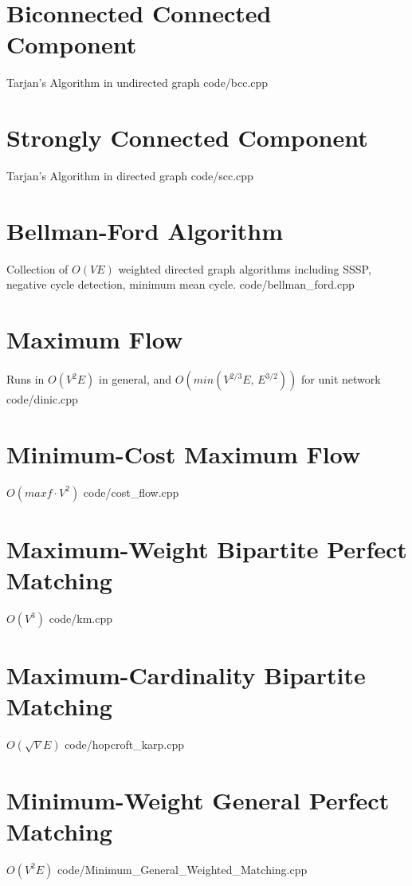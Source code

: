 \documentclass [landscape,8pt,a4paper,twocolumn]{article}
\begin{document}
\section{Biconnected Connected Component}
Tarjan's Algorithm in undirected graph
 {code/bcc.cpp}

\section{Strongly Connected Component}
Tarjan's Algorithm in directed graph
 {code/scc.cpp}

\section{Bellman-Ford Algorithm}
Collection of $ O(VE) $ weighted directed graph algorithms including SSSP, negative cycle detection, minimum mean cycle.
 {code/bellman_ford.cpp}

\vfill\null

\section{Maximum Flow}
Runs in $ O(V^2E) $ in general, and $ O(min(V^{2/3}E,\, E^{3/2})) $ for unit network
 {code/dinic.cpp}

\section{Minimum-Cost Maximum Flow}
$ O(maxf \cdot V^2) $
 {code/cost_flow.cpp}

\section{Maximum-Weight Bipartite Perfect Matching}
$ O(V^3) $
 {code/km.cpp}

\vfill\null

\section{Maximum-Cardinality Bipartite Matching}
$ O(\sqrt{V}E) $
 {code/hopcroft_karp.cpp}

\vfill\null

\section{Minimum-Weight General Perfect Matching}
$ O(V^2E) $
 {code/Minimum_General_Weighted_Matching.cpp}
\end{document}

